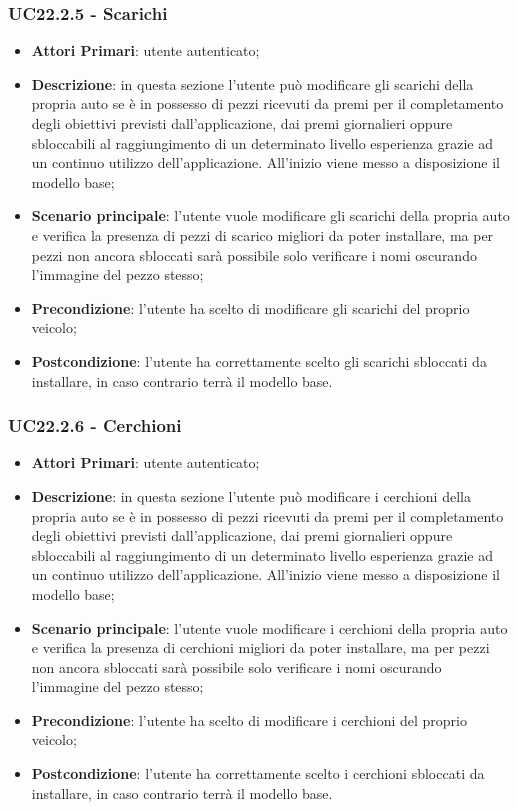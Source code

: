 \subsubsection{UC22.2.5 - Scarichi}
\begin{itemize}
	\item \textbf{Attori Primari}: utente autenticato;
	\item \textbf{Descrizione}: in questa sezione l'utente può modificare gli scarichi della propria auto se è in possesso di pezzi ricevuti da premi per il completamento degli obiettivi previsti dall'applicazione, dai premi giornalieri oppure sbloccabili al raggiungimento di un determinato livello esperienza grazie ad un continuo utilizzo dell'applicazione.
	All'inizio viene messo a disposizione il modello base;
	\item \textbf{Scenario principale}: l'utente vuole modificare gli scarichi della propria auto e verifica la presenza di pezzi di scarico migliori da poter installare, ma per pezzi non ancora sbloccati sarà possibile solo verificare i nomi oscurando l'immagine del pezzo stesso;
	\item \textbf{Precondizione}: l'utente ha scelto di modificare gli scarichi del proprio veicolo; 
	\item \textbf{Postcondizione}: l'utente ha correttamente scelto gli scarichi sbloccati da installare, in caso contrario terrà il modello base.
\end{itemize}
\subsubsection{UC22.2.6 - Cerchioni}
\begin{itemize}
	\item \textbf{Attori Primari}: utente autenticato;
	\item \textbf{Descrizione}: in questa sezione l'utente può modificare i cerchioni della propria auto se è in possesso di pezzi ricevuti da premi per il completamento degli obiettivi previsti dall'applicazione, dai premi giornalieri oppure sbloccabili al raggiungimento di un determinato livello esperienza grazie ad un continuo utilizzo dell'applicazione.
	All'inizio viene messo a disposizione il modello base;
	\item \textbf{Scenario principale}: l'utente vuole modificare i cerchioni della propria auto e verifica la presenza di cerchioni migliori da poter installare, ma per pezzi non ancora sbloccati sarà possibile solo verificare i nomi oscurando l'immagine del pezzo stesso;
	\item \textbf{Precondizione}: l'utente ha scelto di modificare i cerchioni del proprio veicolo; 
	\item \textbf{Postcondizione}: l'utente ha correttamente scelto i cerchioni sbloccati da installare, in caso contrario terrà il modello base.
\end{itemize} 
